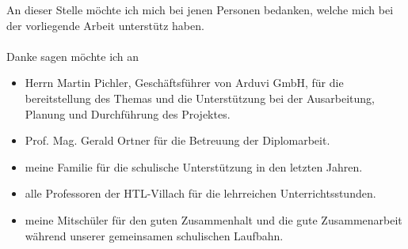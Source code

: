 An dieser Stelle möchte ich mich bei jenen Personen bedanken, welche mich bei der vorliegende Arbeit unterstütz haben.
\\\\
Danke sagen möchte ich an
\begin{itemize}
    \item Herrn Martin Pichler, Geschäftsführer von Arduvi GmbH, für die bereitstellung des Themas und 
    die Unterstützung bei der Ausarbeitung, Planung und Durchführung des Projektes.
    \item Prof. Mag. Gerald Ortner für die Betreuung der Diplomarbeit.
    \item meine Familie für die schulische Unterstützung in den letzten Jahren.
    \item alle Professoren der HTL-Villach für die lehrreichen Unterrichtsstunden.
    \item meine Mitschüler für den guten Zusammenhalt und die gute Zusammenarbeit während 
    unserer gemeinsamen schulischen Laufbahn.
\end{itemize}